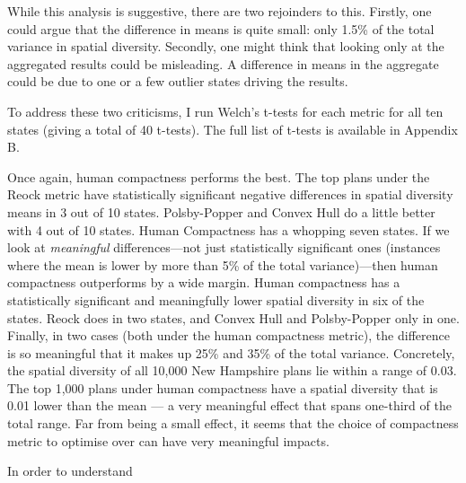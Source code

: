 \documentclass[]{article}
\begin{document}
While this analysis is suggestive, there are two rejoinders to this.
Firstly, one could argue that the difference in means is quite small:
only 1.5\% of the total variance in spatial diversity. Secondly, one
might think that looking only at the aggregated results could be
misleading. A difference in means in the aggregate could be due to one
or a few outlier states driving the results.

To address these two criticisms, I run Welch's t-tests for each metric
for all ten states (giving a total of 40 t-tests). The full list of
t-tests is available in Appendix B.

Once again, human compactness performs the best. The top plans under the
Reock metric have statistically significant negative differences in
spatial diversity means in 3 out of 10 states. Polsby-Popper and Convex
Hull do a little better with 4 out of 10 states. Human Compactness has a
whopping seven states. If we look at \emph{meaningful} differences---not
just statistically significant ones (instances where the mean is lower
by more than 5\% of the total variance)---then human compactness
outperforms by a wide margin. Human compactness has a statistically
significant and meaningfully lower spatial diversity in six of the
states. Reock does in two states, and Convex Hull and Polsby-Popper only
in one. Finally, in two cases (both under the human compactness metric),
the difference is so meaningful that it makes up 25\% and 35\% of the
total variance. Concretely, the spatial diversity of all 10,000 New
Hampshire plans lie within a range of 0.03. The top 1,000 plans under
human compactness have a spatial diversity that is 0.01 lower than the
mean --- a very meaningful effect that spans one-third of the total
range. Far from being a small effect, it seems that the choice of
compactness metric to optimise over can have very meaningful impacts.

In order to understand
\end{document}
